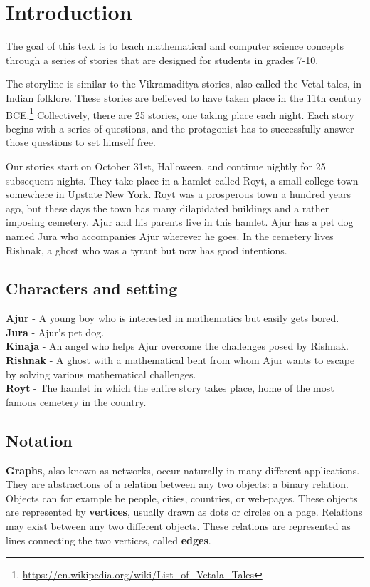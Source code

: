\chapter{Introduction}
The goal of this text is to teach mathematical and computer science concepts through a series of stories
that are designed for students in grades 7-10.

The storyline is similar to the Vikramaditya stories, also called the Vetal tales, in Indian folklore. These stories are believed to have taken place in the 11th century BCE.\footnote{\url{https://en.wikipedia.org/wiki/List_of_Vetala_Tales}}
Collectively, there are 25 stories, one taking place each night. Each story begins with a series of questions, and the protagonist has to successfully answer those questions to set himself free. 


Our stories start on October 31st, Halloween, and continue nightly for 25 subsequent nights. They take place in a hamlet called Royt, a small college town somewhere in Upstate New York. Royt was a prosperous town a hundred years ago, but these days the town has many dilapidated buildings and a rather imposing cemetery. Ajur and his parents live in this hamlet. Ajur has a pet dog named Jura who accompanies Ajur wherever he goes.  In the cemetery lives Rishnak, a ghost who was a tyrant but now has good intentions.

\section{Characters and setting}

\textbf {Ajur} - A young boy who is interested in mathematics but easily gets bored.\\
\noindent
\textbf {Jura} - Ajur's pet dog.\\
\noindent
\textbf{Kinaja} - An angel who helps Ajur overcome the challenges posed by Rishnak.\\
\noindent
\textbf{Rishnak} - A ghost with a mathematical bent from whom Ajur wants to escape by solving various mathematical challenges.\\
\noindent
\textbf{Royt} - The hamlet in which the entire story takes place, home of the most famous cemetery in the country.

\begin{newpage}
\end{newpage}
\section{Notation}
\textbf{Graphs}, also known as networks, occur naturally in many different applications. They are abstractions of a relation between any two objects: a binary relation. Objects can for example be people, cities, countries, or web-pages. These objects are represented by \textbf{vertices}, usually drawn as dots 
or circles on a page. Relations may exist between any two different objects. These relations are represented as lines connecting the two vertices, called \textbf{edges}.

